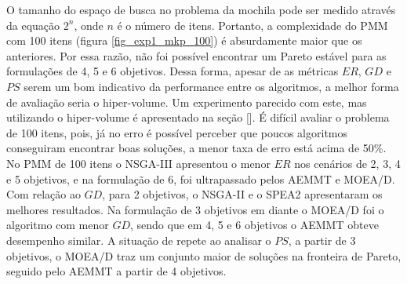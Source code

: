 O tamanho do espaço de busca no problema da mochila pode ser medido através da equação $2^n$, onde $n$ é o número de itens. Portanto, a complexidade do PMM com 100 itens (figura \ref{fig_exp1_mkp_100}) é absurdamente maior que os anteriores. Por essa razão, não foi possível encontrar um Pareto estável para as formulações de 4, 5 e 6 objetivos. Dessa forma, apesar de as métricas $ER$, $GD$ e $PS$ serem um bom indicativo da performance entre os algoritmos, a melhor forma de avaliação seria o hiper-volume. Um experimento parecido com este, mas utilizando o hiper-volume é apresentado na seção []. É difícil avaliar o problema de 100 itens, pois, já no erro é possível perceber que poucos algoritmos conseguiram encontrar boas soluções, a menor taxa de erro está acima de 50\%. No PMM de 100 itens o NSGA-III apresentou o menor $ER$ nos cenários de 2, 3, 4 e 5 objetivos, e na formulação de 6, foi ultrapassado pelos AEMMT e MOEA/D. Com relação ao $GD$, para 2 objetivos, o NSGA-II e o SPEA2 apresentaram os melhores resultados. Na formulação de 3 objetivos em diante o MOEA/D foi o algoritmo com menor $GD$, sendo que em 4, 5 e 6 objetivos o AEMMT obteve desempenho similar. A situação de repete ao analisar o $PS$, a partir de 3 objetivos, o MOEA/D traz um conjunto maior de soluções na fronteira de Pareto, seguido pelo AEMMT a partir de 4 objetivos.

